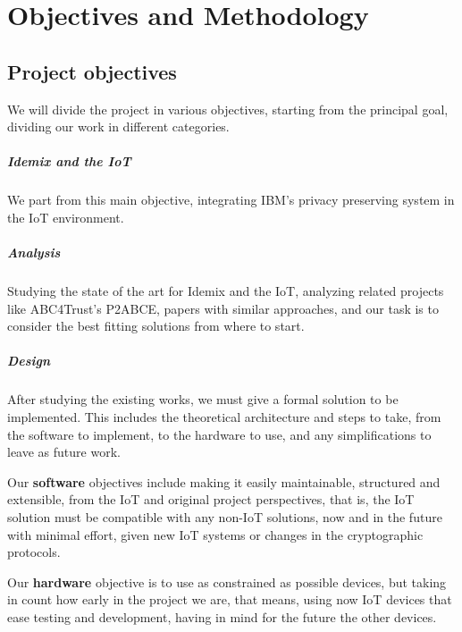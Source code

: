 \chapter{Objectives and Methodology}\label{ch:objandmeth}


\section{Project objectives}

We will divide the project in various objectives, starting from the principal goal, dividing our work in different categories.

\hfil

\paragraph{Idemix and the IoT}
We part from this main objective, integrating IBM's privacy preserving system in the IoT environment. 

\paragraph{Analysis} Studying the state of the art for Idemix and the IoT, analyzing related projects like ABC4Trust's \ac{P2ABCE}, papers with similar approaches, and our task is to consider the best fitting solutions from where to start.

\paragraph{Design} After studying the existing works, we must give a formal solution to be implemented. This includes the theoretical architecture and steps to take, from the software to implement, to the hardware to use, and any simplifications to leave as future work.

Our \textbf{software} objectives include making it easily maintainable, structured and extensible, from the IoT and original project perspectives, that is, the IoT solution must be compatible with any non-IoT solutions, now and in the future with minimal effort, given new IoT systems or changes in the cryptographic protocols.

Our \textbf{hardware} objective is to use as constrained as possible devices, but taking in count how early in the project we are, that means, using now IoT devices that ease testing and development, having in mind for the future the other devices.


